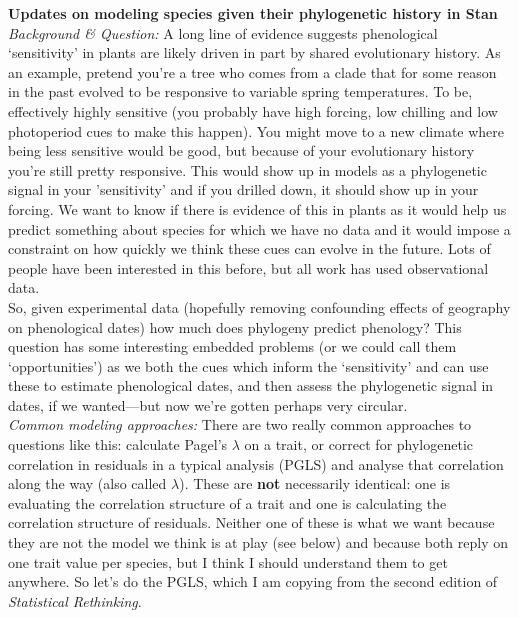 \documentclass[11pt,letter]{article}
\begin{document}

\renewcommand{\refname}{\CHead{}}

{\bf Updates on modeling species given their phylogenetic history in Stan}\\

\emph{Background \& Question:} A long line of evidence suggests phenological `sensitivity' in plants are likely driven in part by shared evolutionary history. As an example, pretend you're a tree who comes from a clade that for some reason in the past evolved to be responsive to variable spring temperatures. To be, effectively highly sensitive (you probably have high forcing, low chilling and low photoperiod cues to make this happen). You might move to a new climate where being less sensitive would be good, but because of your evolutionary history you're still pretty responsive. This would show up in models as a phylogenetic signal in your 'sensitivity' and if you drilled down, it should show up in your forcing. We want to know if there is evidence of this in plants as it would help us predict something about species for which we have no data and it would impose a constraint on how quickly we think these cues can evolve in the future. Lots of people have been interested in this before, but all work has used observational data. \\

So, given experimental data (hopefully removing confounding effects of geography on phenological dates) how much does phylogeny predict phenology? This question has some interesting embedded problems (or we could call them `opportunities') as we both the cues which inform the `sensitivity' and can use these to estimate phenological dates, and then assess the phylogenetic signal in dates, if we wanted---but now we're gotten perhaps very circular.\\

\emph{Common modeling approaches:} There are two really common approaches to questions like this: calculate Pagel's $\lambda$ on a trait, or correct for phylogenetic correlation in residuals in a typical analysis (PGLS) and analyse that correlation along the way (also called $\lambda$). These are {\bf not} necessarily identical: one is evaluating the correlation structure of a trait and one is calculating the correlation structure of residuals. Neither one of these is what we want because they are not the model we think is at play (see below) and because both reply on one trait value per species, but I think I should understand them to get anywhere. So let's do the PGLS, which I am copying from the second edition of \emph{Statistical Rethinking}.\\
\end{document}
